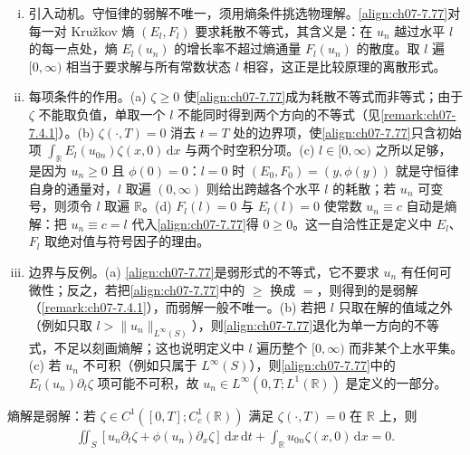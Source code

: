 ﻿\documentclass[../../main.tex]{subfiles}%
\begin{document}
\begin{remark}\label{remark:ch07-Pn熵解}
\begin{enumerate}[(i)]
\item 引入动机。守恒律的弱解不唯一，须用熵条件挑选物理解。\eqref{align:ch07-7.77}对每一对 Kružkov 熵 $(E_l,F_l)$ 要求耗散不等式，其含义是：在 $u_n$ 越过水平 $l$ 的每一点处，熵 $E_l(u_n)$ 的增长率不超过熵通量 $F_l(u_n)$ 的散度。取 $l$ 遍 $[0,\infty)$ 相当于要求解与所有常数状态 $l$ 相容，这正是比较原理的离散形式。
\item 每项条件的作用。(a) $\zeta\geqslant0$ 使\eqref{align:ch07-7.77}成为耗散不等式而非等式；由于 $\zeta$ 不能取负值，单取一个 $l$ 不能同时得到两个方向的不等式（见\cref{remark:ch07-7.4.1}）。(b) $\zeta(\cdot,T)=0$ 消去 $t=T$ 处的边界项，使\eqref{align:ch07-7.77}只含初始项 $\int_{\mathbb{R}}E_l(u_{0n})\zeta(x,0)\,\mathrm{d}x$ 与两个时空积分项。(c) $l\in[0,\infty)$ 之所以足够，是因为 $u_n\geqslant0$ 且 $\phi(0)=0$：$l=0$ 时 $(E_0,F_0)=(y,\phi(y))$ 就是守恒律自身的通量对，$l$ 取遍 $(0,\infty)$ 则给出跨越各个水平 $l$ 的耗散；若 $u_n$ 可变号，则须令 $l$ 取遍 $\mathbb{R}$。(d) $F_l(l)=0$ 与 $E_l(l)=0$ 使常数 $u_n\equiv c$ 自动是熵解：把 $u_n\equiv c=l$ 代入\eqref{align:ch07-7.77}得 $0\geqslant0$。这一自洽性正是定义中 $E_l$、$F_l$ 取绝对值与符号因子的理由。
\item 边界与反例。(a) \eqref{align:ch07-7.77}是弱形式的不等式，它不要求 $u_n$ 有任何可微性；反之，若把\eqref{align:ch07-7.77}中的 $\geqslant$ 换成 $=$，则得到的是弱解（\cref{remark:ch07-7.4.1}），而弱解一般不唯一。(b) 若把 $l$ 只取在解的值域之外（例如只取 $l>\|u_n\|_{L^\infty(S)}$），则\eqref{align:ch07-7.77}退化为单一方向的不等式，不足以刻画熵解；这也说明定义中 $l$ 遍历整个 $[0,\infty)$ 而非某个上水平集。(c) 若 $u_n$ 不可积（例如只属于 $L^\infty(S)$），则\eqref{align:ch07-7.77}中的 $E_l(u_n)\partial_t\zeta$ 项可能不可积，故 $u_n\in L^\infty(0,T;L^1(\mathbb{R}))$ 是定义的一部分。
\end{enumerate}
\end{remark}

\begin{remark}\label{remark:ch07-7.4.1}
熵解是弱解：若 $\zeta\in C^1([0,T];C^1_c(\mathbb{R}))$ 满足 $\zeta(\cdot,T)=0$ 在 $\mathbb{R}$ 上，则
\begin{align}
\iint_S[u_n\partial_t\zeta+\phi(u_n)\partial_x\zeta]\,\mathrm{d}x\,\mathrm{d}t+\int_{\mathbb{R}}u_{0n}\zeta(x,0)\,\mathrm{d}x=0. \label{align:ch07-7.78}
\end{align}
\end{remark}
\end{document}
